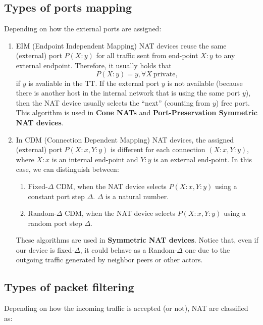 \subsection{Types of ports mapping}

Depending on how the external ports are assigned:

\begin{enumerate}
\item EIM (Endpoint Independent Mapping) NAT devices reuse the same
  (external) port $P(X:y)$ for all traffic sent from
  end-point $X:y$ to any external endpoint. Therefore, it usually
  holds that
  \begin{equation}
    P(X:y)=y, \forall X~\mathrm{private},
  \end{equation}
  if $y$ is avaliable in the TT. If the external port $y$ is not
  available (because there is another host in the internal network
  that is using the same port $y$), then the NAT device usually
  selects the ``next'' (counting from $y$) free port.  This algorithm
  is used in \textbf{Cone NATs} and \textbf{Port-Preservation
    Symmetric NAT devices}.
\item In CDM (Connection Dependent Mapping) NAT devices, the assigned
  (external) port $P(X:x,Y:y)$ is different for each connection
  $(X:x,Y:y)$, where $X:x$ is an internal end-point and $Y:y$ is an
  external end-point. In this case, we can distinguish between:
  \begin{enumerate}
  \item Fixed-$\Delta$ CDM, when the NAT device selects $P(X:x,Y:y)$
    using a constant port step $\Delta$. $\Delta$ is a natural number.
  \item Random-$\Delta$ CDM, when the NAT device selects $P(X:x,Y:y)$
      using a random port step $\Delta$.
  \end{enumerate}
  These algorithms are used in \textbf{Symmetric NAT devices}. Notice
  that, even if our device is fixed-$\Delta$, it could behave as a
  Random-$\Delta$ one due to the outgoing traffic generated by
  neighbor peers or other actors.
\end{enumerate}

\subsection{Types of packet filtering}

Depending on how the incoming traffic is accepted (or not), NAT are
classified as:

